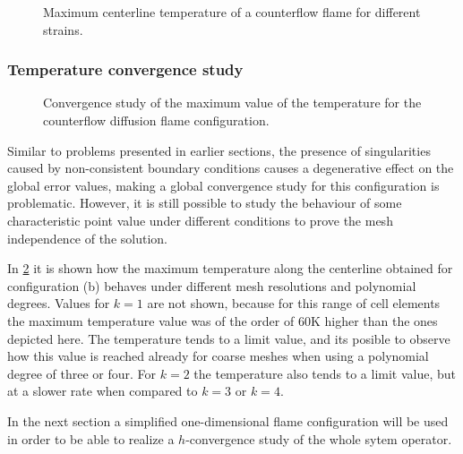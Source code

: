 \begin{figure}[h]
	\centering
	\caption{Maximum centerline temperature of a counterflow flame for different strains.}
	\label{fig:TemperatureStrainPlot}
\end{figure}
\subsubsection{Temperature convergence study}
\begin{figure}[h]
	\centering
	\caption{Convergence study of the maximum value of the temperature for the counterflow diffusion flame configuration.}
	\label{fig:TemperatureConvergenceDiffFlame}
\end{figure}
Similar to problems presented in earlier sections, the presence of singularities caused by non-consistent boundary conditions causes a degenerative effect on the global error values, making a global convergence study for this configuration is problematic. However, it is still possible to study the behaviour of some characteristic point value under different conditions to prove the mesh independence of the solution.

In \cref{fig:TemperatureConvergenceDiffFlame} it is shown how the maximum temperature along the centerline obtained for configuration (b)  behaves under different mesh resolutions and polynomial degrees. Values for $k=1$ are not shown, because for this range of cell elements the maximum temperature value was of the order of 60K higher than the ones depicted here. The temperature tends to a limit value, and its posible to observe how this value is reached already for coarse meshes when using a polynomial degree of three or four. For $k=2$ the temperature also tends to a limit value, but at a slower rate when compared to $k =3$ or $k = 4$. 

In the next section a simplified one-dimensional flame configuration will be used in order to be able to realize a $h$-convergence study of the whole sytem operator.

